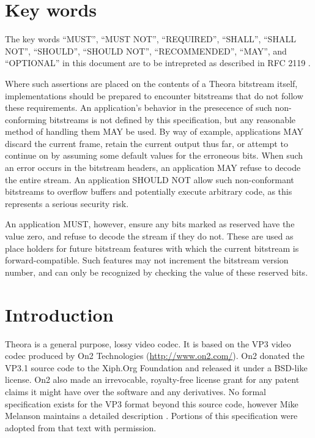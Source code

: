 \documentclass[9pt,letterpaper]{book}
\numberwithin{equation}{chapter}
\numberwithin{figure}{chapter}
\numberwithin{table}{chapter}
\begin{document}
\thispagestyle{plain}
\chapter*{Key words}

\setlength{\emergencystretch}{2em}
The key words ``MUST'', ``MUST NOT'', ``REQUIRED'', ``SHALL'', ``SHALL NOT'',
 ``SHOULD'', ``SHOULD NOT'', ``RECOMMENDED'', ``MAY'', and ``OPTIONAL'' in this
 document are to be intrepreted as described in RFC 2119 \cite{rfc2119}.\par
\setlength{\emergencystretch}{0em}

Where such assertions are placed on the contents of a Theora bitstream itself,
 implementations should be prepared to encounter bitstreams that do not follow
 these requirements.
An application's behavior in the presecence of such non-conforming bitstreams
 is not defined by this specification, but any reasonable method of handling 
 them MAY be used.
By way of example, applications MAY discard the current frame, retain the
 current output thus far, or attempt to continue on by assuming some default
 values for the erroneous bits.
When such an error occurs in the bitstream headers, an application MAY refuse
 to decode the entire stream.
An application SHOULD NOT allow such non-conformant bitstreams to overflow
 buffers and potentially execute arbitrary code, as this represents a serious
 security risk.

An application MUST, however, ensure any bits marked as reserved have the value
 zero, and refuse to decode the stream if they do not.
These are used as place holders for future bitstream features with which the
 current bitstream is forward-compatible.
Such features may not increment the bitstream version number, and can only be
 recognized by checking the value of these reserved bits.

\cleardoublepage



\mainmatter

\setcounter{page}{1}

\chapter{Introduction}

Theora is a general purpose, lossy video codec.
It is based on the VP3 video codec produced by On2 Technologies
 (\url{http://www.on2.com/}).
On2 donated the VP3.1 source code to the Xiph.Org Foundation and released it
 under a BSD-like license.
On2 also made an irrevocable, royalty-free license grant for any patent claims
 it might have over the software and any derivatives.
No formal specification exists for the VP3 format beyond this source code,
 however Mike Melanson maintains a detailed description \cite{Mel04}.
Portions of this specification were adopted from that text with permission.
\end{document}
